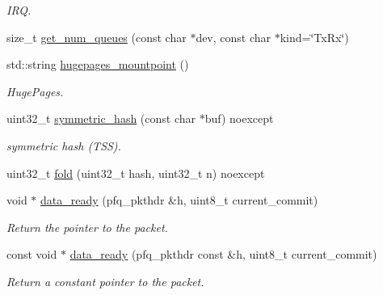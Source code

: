 \begin{DoxyCompactItemize}
\begin{DoxyCompactList}\small\item\em I\+RQ. \end{DoxyCompactList}\item 
size\+\_\+t \hyperlink{namespacepfq_a35dc28fdd850e9c82f1f3861cce2f9cb}{get\+\_\+num\+\_\+queues} (const char $\ast$dev, const char $\ast$kind=\char`\"{}Tx\+Rx\char`\"{})
\item 
std\+::string \hyperlink{namespacepfq_a46be800e747d99af1db9b92a8f296930}{hugepages\+\_\+mountpoint} ()
\begin{DoxyCompactList}\small\item\em Huge\+Pages. \end{DoxyCompactList}\item 
uint32\+\_\+t \hyperlink{namespacepfq_acd3646943e133a2651876f9ca0bd154c}{symmetric\+\_\+hash} (const char $\ast$buf) noexcept
\begin{DoxyCompactList}\small\item\em symmetric hash (T\+SS). \end{DoxyCompactList}\item 
uint32\+\_\+t \hyperlink{namespacepfq_a881bd432d152026217ddbf0ae5d72833}{fold} (uint32\+\_\+t hash, uint32\+\_\+t n) noexcept
\item 
void $\ast$ \hyperlink{namespacepfq_a89313b8c7a729b4e37b751db8ea522f4}{data\+\_\+ready} (pfq\+\_\+pkthdr \&h, uint8\+\_\+t current\+\_\+commit)
\begin{DoxyCompactList}\small\item\em Return the pointer to the packet. \end{DoxyCompactList}\item 
const void $\ast$ \hyperlink{namespacepfq_a50ce09535c2c899fe6b3c069681b4cae}{data\+\_\+ready} (pfq\+\_\+pkthdr const \&h, uint8\+\_\+t current\+\_\+commit)
\begin{DoxyCompactList}\small\item\em Return a constant pointer to the packet. \end{DoxyCompactList}\end{DoxyCompactItemize}
